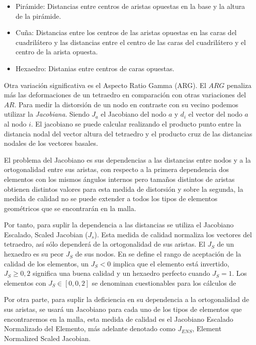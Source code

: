 \begin{itemize}
    \item Pirámide: Distancias entre centros de aristas opuestas en la base y la altura de la pirámide.
    \item Cuña: Distancias entre los centros de las aristas opuestas en las caras del cuadrilátero y las distancias entre el centro de las caras del cuadrilátero y el centro de la arista opuesta.
    \item Hexaedro: Distanias entre centros de caras opuestas.
\end{itemize}

Otra variación significativa es el Aspecto Ratio Gamma (ARG). El $ARG$ penaliza más las deformaciones de un tetraedro en comparación con otras variaciones del $AR$.
Para medir la distorsión de un nodo en contraste con su vecino podemos utilizar la \textit{Jacobiana}. Siendo $J_a$ el Jacobiano del nodo $a$ y $d_i$ el vector del nodo $a$ al nodo $i$. El jacobiano se puede calcular realizando el producto punto entre la distancia nodal del vector altura del tetraedro y el producto cruz de las distancias nodales de los vectores basales.

El problema del Jacobiano es sus dependencias a las distancias entre nodos y a la ortogonalidad entre sus aristas, con respecto a la primera dependencia dos elementos con los mismos ángulos internos pero tamaños distintos de aristas obtienen distintos valores para esta medida de distorsión y sobre la segunda, la medida de calidad no se puede extender a todos los tipos de elementos geométricos que se encontrarán en la malla.

Por tanto, para suplir la dependencia a las distancias se utiliza el Jacobiano Escalado, Scaled Jacobian ($J_s$).
Esta medida de calidad normaliza los vectores del tetraedro, así sólo dependerá de la ortogonalidad de sus aristas.
El $J_S$ de un hexaedro es su peor $J_S$ de sus nodos. En \cite{daines2018repairing} se define el rango de aceptación de la calidad de los elementos, un $J_S < 0$ implica que el elemento está invertido, $J_S \geq 0,2$ significa una buena calidad y un hexaedro perfecto cuando $J_S = 1$. Los elementos con $J_S \in [0, 0,2]$ se denominan cuestionables para los cálculos de \cite{shepherd-2008}

Por otra parte, para suplir la deficiencia en su dependencia a la ortogonalidad de sus aristas, se usará un Jacobiano para cada uno de los tipos de elementos que encontraremos en la malla, esta medida de calidad es el Jacobiano Escalado Normalizado del Elemento, más adelante denotado como $J_{ENS}$,  Element Normalized Scaled Jacobian. 

